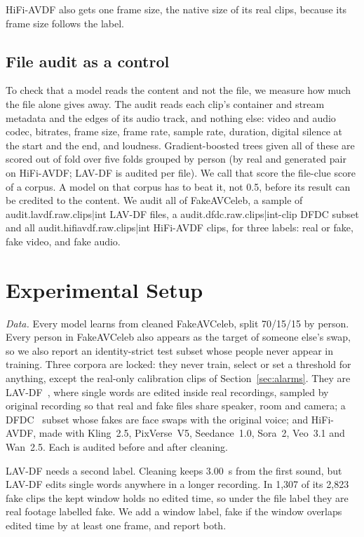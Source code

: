 \documentclass[conference]{IEEEtran}
\begin{document}
HiFi-AVDF also gets one frame size, the native size of its real clips, because
its frame size follows the label.

\subsection{File audit as a control}
\label{sec:audit}

To check that a model reads the content and not the file, we measure how much
the file alone gives away. The audit reads each clip's container and stream
metadata and the edges of its audio track, and nothing else: video and audio
codec, bitrates, frame size, frame rate, sample rate, duration, digital
silence at the start and the end, and loudness. Gradient-boosted trees given
all of these are scored out of fold over five folds grouped by person (by real
and generated pair on HiFi-AVDF; LAV-DF is audited per file). We call that
score the file-clue score of a corpus. A model on that corpus has to beat it,
not 0.5, before its result can be credited to the content. We audit all of
FakeAVCeleb, a sample of {{audit.lavdf.raw.clips|int}} LAV-DF files, a
{{audit.dfdc.raw.clips|int}}-clip DFDC subset and all
{{audit.hifiavdf.raw.clips|int}} HiFi-AVDF clips, for three labels: real or
fake, fake video, and fake audio.

\section{Experimental Setup}
\label{sec:setup}

\textit{Data.} Every model learns from cleaned FakeAVCeleb, split 70/15/15 by
person. Every person in FakeAVCeleb also appears as the target of someone
else's swap, so we also report an identity-strict test subset whose people
never appear in training. Three corpora are locked: they never train, select
or set a threshold for anything, except the real-only calibration clips of
Section~\ref{sec:alarms}. They are LAV-DF~\cite{lavdf}, where single words are
edited inside real recordings, sampled by original recording so that real and
fake files share speaker, room and camera; a DFDC~\cite{dfdc} subset whose
fakes are face swaps with the original voice; and HiFi-AVDF, made with Kling~2.5,
PixVerse~V5, Seedance~1.0, Sora~2, Veo~3.1 and Wan~2.5. Each is audited before
and after cleaning.

LAV-DF needs a second label. Cleaning keeps 3.00~s from the first sound, but
LAV-DF edits single words anywhere in a longer recording. In 1,307 of its 2,823
fake clips the kept window holds no edited time, so under the file label they
are real footage labelled fake. We add a window label, fake if the window
overlaps edited time by at least one frame, and report both.
\end{document}
